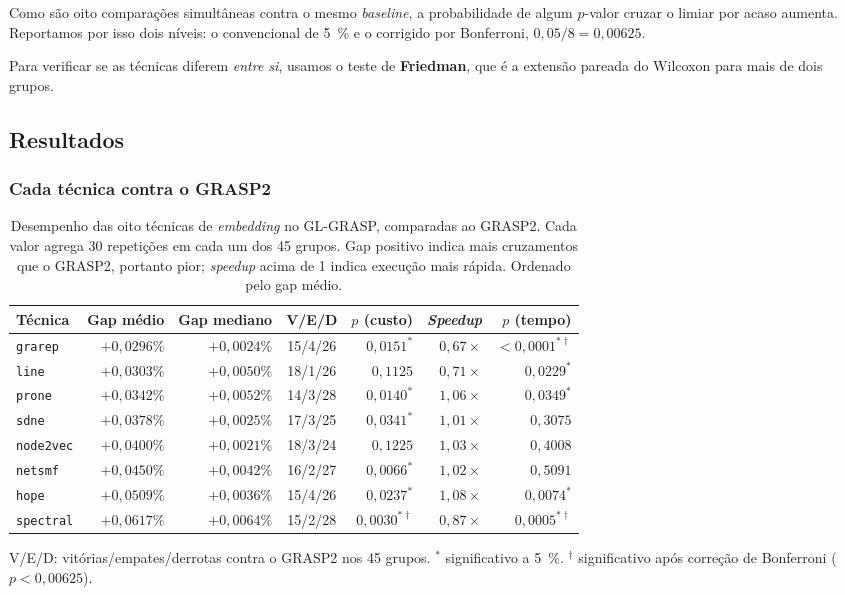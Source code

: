\documentclass[12pt,a4paper]{article}
\begin{document}
Como são oito comparações simultâneas contra o mesmo \textit{baseline}, a
probabilidade de algum $p$-valor cruzar o limiar por acaso aumenta.
Reportamos por isso dois níveis: o convencional de \SI{5}{\percent} e o
corrigido por Bonferroni, $0{,}05/8 = 0{,}00625$.

Para verificar se as técnicas diferem \emph{entre si}, usamos o teste de
\textbf{Friedman}, que é a extensão pareada do Wilcoxon para mais de dois
grupos.

\subsection{Resultados}

\subsubsection{Cada técnica contra o GRASP2}

\begin{table}[htbp]
\centering\small
\caption{Desempenho das oito técnicas de \textit{embedding} no GL-GRASP,
comparadas ao GRASP2. Cada valor agrega 30 repetições em cada um dos 45
grupos. Gap positivo indica mais cruzamentos que o GRASP2, portanto pior;
\textit{speedup} acima de 1 indica execução mais rápida. Ordenado pelo
gap médio.}
\label{tab:tecnicas-vs-grasp2}
\begin{tabular}{lrrcrrr}
\toprule
Técnica & Gap médio & Gap mediano & V/E/D & $p$ (custo) & \textit{Speedup} & $p$ (tempo) \\
\midrule
\texttt{grarep}   & $+0{,}0296\%$ & $+0{,}0024\%$ & 15/4/26 & $0{,}0151^{*}$      & $0{,}67\times$ & $<0{,}0001^{*\dagger}$ \\
\texttt{line}     & $+0{,}0303\%$ & $+0{,}0050\%$ & 18/1/26 & $0{,}1125$          & $0{,}71\times$ & $0{,}0229^{*}$ \\
\texttt{prone}    & $+0{,}0342\%$ & $+0{,}0052\%$ & 14/3/28 & $0{,}0140^{*}$      & $1{,}06\times$ & $0{,}0349^{*}$ \\
\texttt{sdne}     & $+0{,}0378\%$ & $+0{,}0025\%$ & 17/3/25 & $0{,}0341^{*}$      & $1{,}01\times$ & $0{,}3075$ \\
\texttt{node2vec} & $+0{,}0400\%$ & $+0{,}0021\%$ & 18/3/24 & $0{,}1225$          & $1{,}03\times$ & $0{,}4008$ \\
\texttt{netsmf}   & $+0{,}0450\%$ & $+0{,}0042\%$ & 16/2/27 & $0{,}0066^{*}$      & $1{,}02\times$ & $0{,}5091$ \\
\texttt{hope}     & $+0{,}0509\%$ & $+0{,}0036\%$ & 15/4/26 & $0{,}0237^{*}$      & $1{,}08\times$ & $0{,}0074^{*}$ \\
\texttt{spectral} & $+0{,}0617\%$ & $+0{,}0064\%$ & 15/2/28 & $0{,}0030^{*\dagger}$ & $0{,}87\times$ & $0{,}0005^{*\dagger}$ \\
\bottomrule
\end{tabular}

\vspace{2mm}
\footnotesize
V/E/D: vitórias/empates/derrotas contra o GRASP2 nos 45 grupos.
$^{*}$ significativo a \SI{5}{\percent}.
$^{\dagger}$ significativo após correção de Bonferroni ($p < 0{,}00625$).
\end{table}
\end{document}
